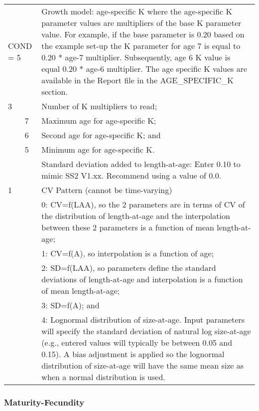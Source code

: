 \begin{longtable}{p{0.5cm} p{2cm} p{12.5cm}}
	\multicolumn{2}{l}{COND = 5} & Growth model: age-specific K where the age-specific K parameter values are multipliers of the base K parameter value. For example, if the base parameter is 0.20 based on the example set-up the K parameter for age 7 is equal to 0.20 * age-7 multiplier. Subsequently, age 6 K value is equal 0.20 * age-6 multiplier. The age specific K values are available in the Report file in the AGE\_SPECIFIC\_K section. \\
	3 & & Number of K multipliers to read; \\
	& 7 & Maximum age for age-specific K; \\
	& 6 & Second age for age-specific K; and \\
	& 5 & Minimum age for age-specific K. \Bstrut\\
	\hline

	\Tstrut 0 & & Standard deviation added to length-at-age: Enter 0.10 to mimic SS2 V1.xx. Recommend using a value of 0.0. \Bstrut\\
	\hline

	1 & & CV Pattern (cannot be time-varying) \Tstrut\\
	  & & 0: CV=f(LAA), so the 2 parameters are in terms of CV of the distribution of length-at-age and the interpolation between these 2 parameters is a function of mean length-at-age; \\
	  & & 1: CV=f(A), so interpolation is a function of age; \\
	  & & 2: SD=f(LAA), so parameters define the standard deviations of length-at-age and interpolation is a function of mean length-at-age; \\
	  & & 3: SD=f(A); and \\
	  & & 4: Lognormal distribution of size-at-age. Input parameters will specify the standard deviation of natural log size-at-age (e.g., entered values will typically be between 0.05 and 0.15). A bias adjustment is applied so the lognormal distribution of size-at-age will have the same mean size as when a normal distribution is used. \Bstrut\\
	\hline
\end{longtable}


\subsubsection{Maturity-Fecundity}

